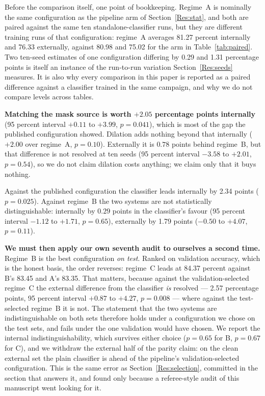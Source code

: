 \documentclass{melba}
\begin{document}
Before the comparison itself, one point of bookkeeping. Regime~A is nominally the same configuration as the pipeline arm of Section~\ref{Res:stat}, and both are paired against the same ten standalone-classifier runs, but they are different training runs of that configuration: regime~A averages 81.27 percent internally and 76.33 externally, against 80.98 and 75.02 for the arm in Table~\ref{tab:paired}. Two ten-seed estimates of one configuration differing by 0.29 and 1.31 percentage points is itself an instance of the run-to-run variation Section~\ref{Res:seeds} measures. It is also why every comparison in this paper is reported as a paired difference against a classifier trained in the same campaign, and why we do not compare levels across tables.

\textbf{Matching the mask source is worth $+2.05$ percentage points internally} (95 percent interval $+0.11$ to $+3.99$, $p=0.041$), which is most of the gap the published configuration showed. Dilation adds nothing beyond that internally ($+2.00$ over regime~A, $p=0.10$). Externally it is $0.78$ points behind regime~B, but that difference is not resolved at ten seeds (95 percent interval $-3.58$ to $+2.01$, $p=0.54$), so we do not claim dilation costs anything; we claim only that it buys nothing.

Against the published configuration the classifier leads internally by 2.34 points ($p=0.025$). Against regime~B the two systems are not statistically distinguishable: internally by $0.29$ points in the classifier's favour (95 percent interval $-1.12$ to $+1.71$, $p=0.65$), externally by 1.79 points ($-0.50$ to $+4.07$, $p=0.11$).

\textbf{We must then apply our own seventh audit to ourselves a second time.} Regime~B is the best configuration \emph{on test}. Ranked on validation accuracy, which is the honest basis, the order reverses: regime~C leads at 84.37 percent against B's 83.45 and A's 83.35. That matters, because against the validation-selected regime~C the external difference from the classifier \emph{is} resolved --- 2.57 percentage points, 95 percent interval $+0.87$ to $+4.27$, $p=0.008$ --- where against the test-selected regime~B it is not. The statement that the two systems are indistinguishable on both sets therefore holds under a configuration we chose on the test sets, and fails under the one validation would have chosen. We report the internal indistinguishability, which survives either choice ($p=0.65$ for B, $p=0.67$ for C), and we withdraw the external half of the parity claim: on the clean external set the plain classifier is ahead of the pipeline's validation-selected configuration. This is the same error as Section~\ref{Res:selection}, committed in the section that answers it, and found only because a referee-style audit of this manuscript went looking for it.
\end{document}
